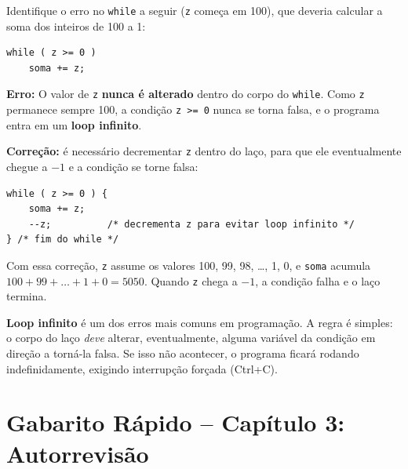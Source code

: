 \documentclass[12pt,a4paper]{article}
\begin{document}
\begin{enunciadoBox}[Enunciado 3.10]
Identifique o erro no \texttt{while} a seguir (\texttt{z} começa em 100), que
deveria calcular a soma dos inteiros de 100 a 1:
\begin{lstlisting}
while ( z >= 0 )
    soma += z;
\end{lstlisting}
\end{enunciadoBox}

\begin{respostabox}
\textbf{Erro:} O valor de \texttt{z} \textbf{nunca é alterado} dentro do corpo do
\texttt{while}. Como \texttt{z} permanece sempre 100, a condição \texttt{z >= 0}
nunca se torna falsa, e o programa entra em um \textbf{loop infinito}.

\medskip\textbf{Correção:} é necessário decrementar \texttt{z} dentro do laço,
para que ele eventualmente chegue a $-1$ e a condição se torne falsa:

\begin{lstlisting}
while ( z >= 0 ) {
    soma += z;
    --z;          /* decrementa z para evitar loop infinito */
} /* fim do while */
\end{lstlisting}

Com essa correção, \texttt{z} assume os valores 100, 99, 98, \ldots, 1, 0, e
\texttt{soma} acumula \(100+99+\ldots+1+0 = 5050\). Quando \texttt{z} chega a $-1$,
a condição falha e o laço termina.

\begin{erroco}
  \textbf{Loop infinito} é um dos erros mais comuns em programação. A regra é
  simples: o corpo do laço \textit{deve} alterar, eventualmente, alguma variável
  da condição em direção a torná-la falsa. Se isso não acontecer, o programa
  ficará rodando indefinidamente, exigindo interrupção forçada (Ctrl+C).
\end{erroco}
\end{respostabox}

\newpage

\section*{Gabarito Rápido -- Capítulo 3: Autorrevisão}
\end{document}
